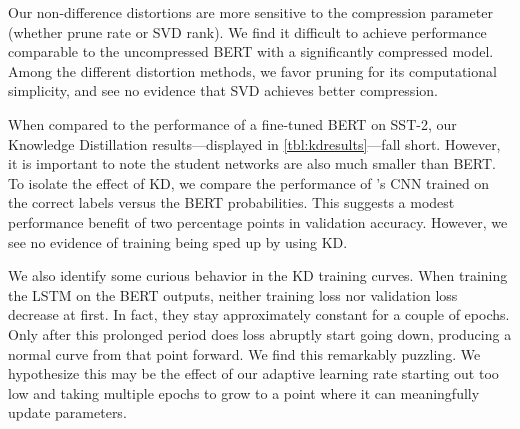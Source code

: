 \documentclass[10pt]{article}
\newcommand{\bert}{\operatorname{BERT}}
\begin{document}
Our non-difference distortions are more sensitive to the compression parameter
(whether prune rate or SVD rank). We find it difficult to achieve performance
comparable to the uncompressed BERT with a significantly compressed model. Among
the different distortion methods, we favor pruning for its computational
simplicity, and see no evidence that SVD achieves better compression.

% 

When compared to the performance of a fine-tuned BERT on SST-2, our Knowledge
Distillation results---displayed in \cref{tbl:kdresults}---fall short. However,
it is important to note the student networks are also much smaller than BERT. To
isolate the effect of KD, we compare the performance of
\citet{kim2014convolutional}'s CNN trained on the correct labels versus the BERT
probabilities. This suggests a modest performance benefit of two percentage
points in validation accuracy. However, we see no evidence of training being
sped up by using KD.

We also identify some curious behavior in the KD training curves. When training
the LSTM on the BERT outputs, neither training loss nor validation loss decrease
at first. In fact, they stay approximately constant for a couple of epochs. Only
after this prolonged period does loss abruptly start going down, producing a
normal curve from that point forward. We find this remarkably puzzling. We
hypothesize this may be the effect of our adaptive learning rate starting out
too low and taking multiple epochs to grow to a point where it can meaningfully
update parameters. 
\end{document}
